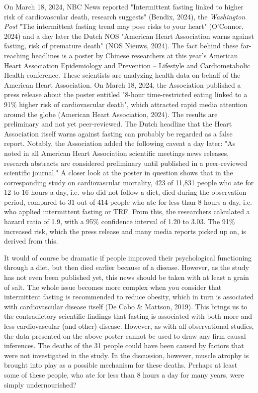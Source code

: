 \documentclass[authordate, empirical]{jote-new-article}
\begin{document}
On March 18, 2024, NBC News reported "Intermittent fasting linked to higher risk of cardiovascular death, research suggests" (Bendix, 2024), the \emph{Washington Post} "The intermittent fasting trend may pose risks to your heart" (O'Connor, 2024) and a day later the Dutch NOS "American Heart Association warns against fasting, risk of premature death" (NOS Nieuws, 2024). The fact behind these far-reaching headlines is a poster by Chinese researchers at this year's American Heart Association Epidemiology and Prevention -- Lifestyle and Cardiometabolic Health conference. These scientists are analyzing health data on behalf of the American Heart Association. On March 18, 2024, the Association published a press release about the poster entitled "8-hour time-restricted eating linked to a 91\% higher risk of cardiovascular death", which attracted rapid media attention around the globe (American Heart Association, 2024). The results are preliminary and not yet peer-reviewed. The Dutch headline that the Heart Association itself warns against fasting can probably be regarded as a false report. Notably, the Association added the following caveat a day later: "As noted in all American Heart Association scientific meetings news releases, research abstracts are considered preliminary until published in a peer-reviewed scientific journal." A closer look at the poster in question shows that in the corresponding study on cardiovascular mortality, 423 of 11,831 people who ate for 12 to 16 hours a day, i.e. who did not follow a diet, died during the observation period, compared to 31 out of 414 people who ate for less than 8 hours a day, i.e. who applied intermittent fasting or TRF. From this, the researchers calculated a hazard ratio of 1.9, with a 95\% confidence interval of 1.20 to 3.03. The 91\% increased risk, which the press release and many media reports picked up on, is derived from this.







It would of course be dramatic if people improved their psychological functioning through a diet, but then died earlier because of a disease. However, as the study has not even been published yet, this news should be taken with at least a grain of salt. The whole issue becomes more complex when you consider that intermittent fasting is recommended to reduce obesity, which in turn is associated with cardiovascular disease itself (De Cabo \& Mattson, 2019). This brings us to the contradictory scientific findings that fasting is associated with both more and less cardiovascular (and other) disease. However, as with all observational studies, the data presented on the above poster cannot be used to draw any firm causal inferences. The deaths of the 31 people could have been caused by factors that were not investigated in the study. In the discussion, however, muscle atrophy is brought into play as a possible mechanism for these deaths. Perhaps at least some of these people, who ate for less than 8 hours a day for many years, were simply undernourished?
\end{document}
